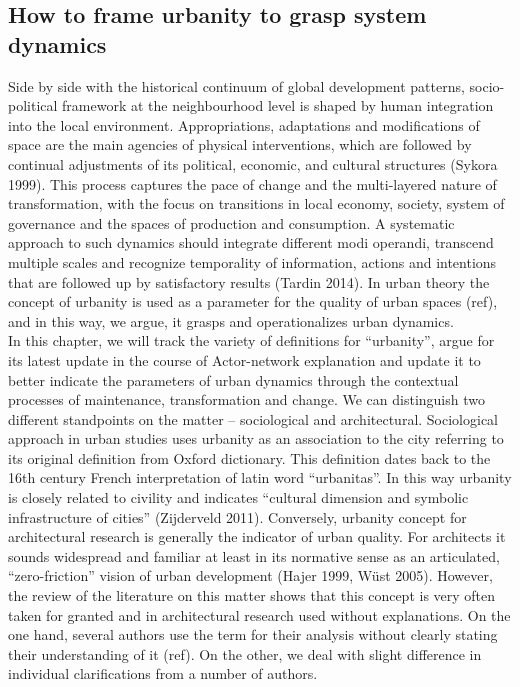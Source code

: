 \documentclass[11pt]{report}
\begin{document}
\subsection{How to frame urbanity to grasp system dynamics}

Side by side with the historical continuum of global development patterns, socio-political framework at the neighbourhood level is shaped by human integration into the local environment. Appropriations, adaptations and modifications of space are the main agencies of physical interventions, which are followed by continual adjustments of its political, economic, and cultural structures (Sykora 1999). This process captures the pace of change and the multi-layered nature of transformation, with the focus on transitions in local economy, society, system of governance and the spaces of production and consumption. A systematic approach to such dynamics should integrate different modi operandi, transcend multiple scales and recognize temporality of information, actions and intentions that are followed up by satisfactory results (Tardin 2014). In urban theory the concept of urbanity is used as a parameter for the quality of urban spaces (ref), and in this way, we argue, it grasps and operationalizes urban dynamics.
\\
In this chapter, we will track the variety of definitions for “urbanity”, argue for its latest update in the course of Actor-network explanation and update it to better indicate the parameters of urban dynamics through the contextual processes of maintenance, transformation and change. We can distinguish two different standpoints on the matter – sociological and architectural. Sociological approach in urban studies uses urbanity as an association to the city referring to its original definition from Oxford dictionary. This definition dates back to the 16th century French interpretation of latin word “urbanitas”. In this way urbanity is closely related to civility  and indicates “cultural dimension and symbolic infrastructure of cities” (Zijderveld 2011). Conversely, urbanity concept for architectural research is generally the indicator of urban quality. For architects it sounds widespread and familiar at least in its normative sense as an articulated, “zero-friction” vision of urban development (Hajer 1999, Wüst 2005). However, the review of the literature on this matter shows that this concept is very often taken for granted and in architectural research used without explanations. On the one hand, several authors use the term for their analysis without clearly stating their understanding of it (ref). On the other, we deal with slight difference in individual clarifications from a number of authors.
\end{document}
